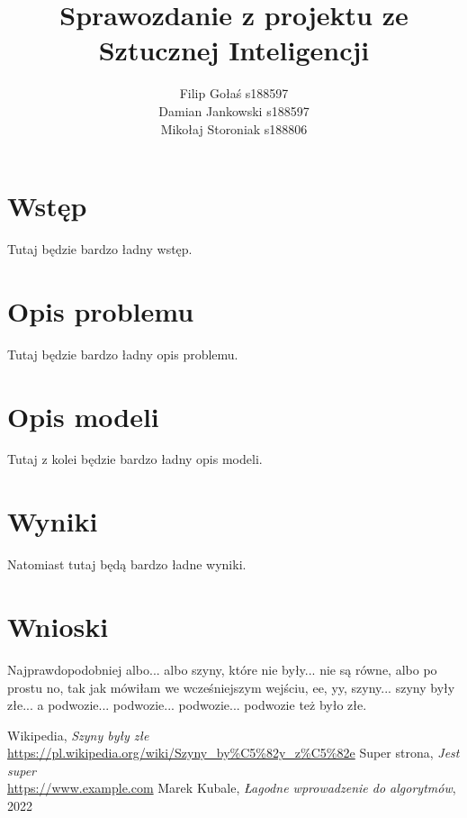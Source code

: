 \documentclass{article}
\title{Sprawozdanie z projektu ze Sztucznej Inteligencji}
\author{Filip Gołaś s188597 \\ Damian Jankowski s188597 \\ Mikołaj Storoniak s188806}
\begin{document}
\maketitle

\section{Wstęp}
Tutaj będzie bardzo ładny wstęp.

\section{Opis problemu}

Tutaj będzie bardzo ładny opis problemu.

\section{Opis modeli}

Tutaj z kolei będzie bardzo ładny opis modeli.

\section{Wyniki}

Natomiast tutaj będą bardzo ładne wyniki.

\section{Wnioski}

Najprawdopodobniej albo... albo szyny, 
które nie były... nie są równe, 
albo po prostu no, tak jak mówiłam we 
wcześniejszym wejściu, ee, yy, szyny... 
szyny były złe... a podwozie... podwozie... 
podwozie... podwozie też było złe. \cite{szyny}

\renewcommand{\refname}{Źródła}
\begin{thebibliography}{100}
     Wikipedia, 
    \textit{Szyny były złe} 
    \\\url{https://pl.wikipedia.org/wiki/Szyny_by%C5%82y_z%C5%82e}
     Super strona,
    \textit{Jest super}
    \\\url{https://www.example.com}
     Marek Kubale,
    \textit{Łagodne wprowadzenie do algorytmów}, 2022
\end{thebibliography}
\end{document}
